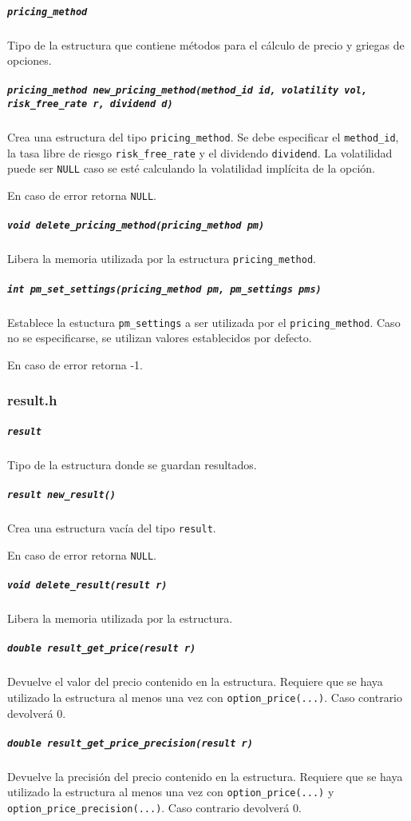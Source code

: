 \documentclass[12pt,a4paper,final]{article}
\begin{document}
			\subparagraph{\texttt{pricing\_method}}
				Tipo de la estructura que contiene métodos para el cálculo de precio y griegas
				de opciones.

			\subparagraph{\texttt{pricing\_method new\_pricing\_method(method\_id id, volatility vol, risk\_free\_rate r, dividend d)}}
				Crea una estructura del tipo \texttt{pricing\_method}. Se debe especificar el \texttt{method\_id},
				la tasa libre de riesgo \texttt{risk\_free\_rate} y el dividendo \texttt{dividend}. La volatilidad
				puede ser \texttt{NULL} caso se esté calculando la volatilidad implícita de la opción.

				En caso de error retorna \texttt{NULL}.

			\subparagraph{\texttt{void delete\_pricing\_method(pricing\_method pm)}}
				Libera la memoria utilizada por la estructura \texttt{pricing\_method}.

			\subparagraph{\texttt{int pm\_set\_settings(pricing\_method pm, pm\_settings pms)}}
				Establece la estuctura \texttt{pm\_settings} a ser utilizada por el \texttt{pricing\_method}.
				Caso no se especificarse, se utilizan valores establecidos por defecto.

				En caso de error retorna -1.

		\subsubsection{result.h}
			\subparagraph{\texttt{result}}
				Tipo de la estructura donde se guardan resultados.

			\subparagraph{\texttt{result new\_result()}}
				Crea una estructura vacía del tipo \texttt{result}.

				En caso de error retorna \texttt{NULL}.

			\subparagraph{\texttt{void delete\_result(result r)}}
				Libera la memoria utilizada por la estructura.

			\subparagraph{\texttt{double result\_get\_price(result r)}}
				Devuelve el valor del precio contenido en la estructura.
				Requiere que se haya utilizado la estructura al menos una vez
				con \texttt{option\_price(...)}. Caso contrario devolverá 0.

			\subparagraph{\texttt{double result\_get\_price\_precision(result r)}}
				Devuelve la precisión del precio contenido en la estructura.
				Requiere que se haya utilizado la estructura al menos una vez
				con \texttt{option\_price(...)} y \texttt{option\_price\_precision(...)}.
				Caso contrario devolverá 0.
\end{document}
